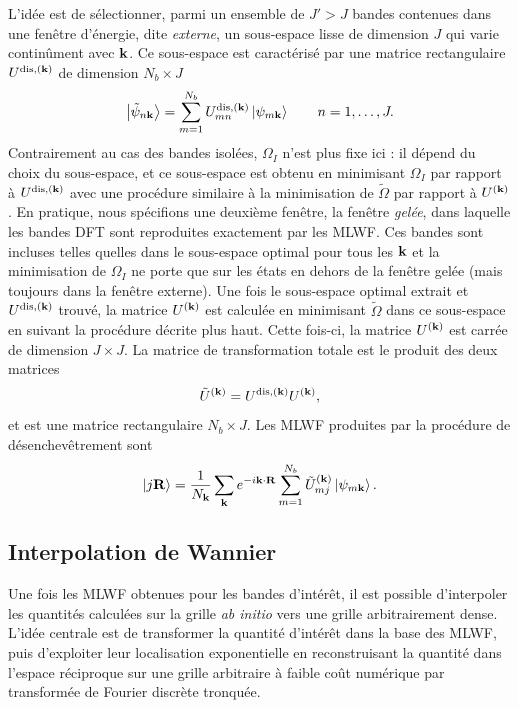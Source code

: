 L'idée est de sélectionner, parmi un ensemble de $J'>J$ bandes contenues dans une fenêtre d'énergie, dite \textit{externe}, un sous-espace lisse de dimension $J$ qui varie continûment avec $\mathbf{k}$. Ce sous-espace est caractérisé par une matrice rectangulaire $U^{\text{dis},(\mathbf{k})}$ de dimension $N_b\times J$
\begin{equation}
    \ket{\tilde{\psi}_{n\mathbf{k}}}=\sum_{m=1}^{N_b}U_{mn}^{\text{dis},(\mathbf{k})}\ket{\psi_{m\mathbf{k}}}\qquad n=1,\dots,J.
\end{equation}
Contrairement au cas des bandes isolées, $\Omega_I$ n'est plus fixe ici : il dépend du choix du sous-espace, et ce sous-espace est obtenu en minimisant $\Omega_I$ par rapport à $U^{\text{dis},(\mathbf{k})}$ avec une procédure similaire à la minimisation de $\widetilde{\Omega}$ par rapport à $U^{(\mathbf{k})}$. En pratique, nous spécifions une deuxième fenêtre, la fenêtre \textit{gelée}, dans laquelle les bandes DFT sont reproduites exactement par les MLWF. Ces bandes sont incluses telles quelles dans le sous-espace optimal pour tous les $\mathbf{k}$ et la minimisation de $\Omega_I$ ne porte que sur les états en dehors de la fenêtre gelée (mais toujours dans la fenêtre externe). Une fois le sous-espace optimal extrait et $U^{\text{dis},(\mathbf{k})}$ trouvé, la matrice $U^{(\mathbf{k})}$ est calculée en minimisant $\widetilde{\Omega}$ dans ce sous-espace en suivant la procédure décrite plus haut. Cette fois-ci, la matrice $U^{(\mathbf{k})}$ est carrée de dimension $J\times J$. La matrice de transformation totale est le produit des deux matrices
\begin{equation}
    \tilde{U}^{(\mathbf{k})} = U^{\text{dis},(\mathbf{k})}U^{(\mathbf{k})},
\end{equation}
et est une matrice rectangulaire $N_b\times J$. Les MLWF produites par la procédure de désenchevêtrement sont
\begin{equation}
    \ket{j\mathbf{R}}=\frac{1}{N_{\mathbf{k}}}\sum_{\mathbf{k}}e^{-i\mathbf{k}\cdot\mathbf{R}}\sum_{m=1}^{N_b}\tilde{U}^{(\mathbf{k})}_{mj}\ket{\psi_{m\mathbf{k}}}.\label{eqn:c2_mlwf}
\end{equation}

\subsection{Interpolation de Wannier}

Une fois les MLWF obtenues pour les bandes d'intérêt, il est possible d'interpoler les quantités calculées sur la grille \textit{ab initio} vers une grille arbitrairement dense. L'idée centrale est de transformer la quantité d'intérêt dans la base des MLWF, puis d'exploiter leur localisation exponentielle en reconstruisant la quantité dans l'espace réciproque sur une grille arbitraire à faible coût numérique par transformée de Fourier discrète tronquée.

